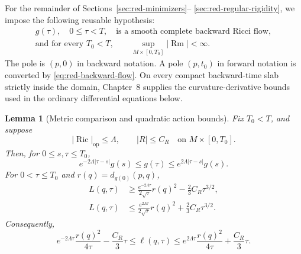 \documentclass[10pt]{coll-l}
\newtheorem{lemma}[theorem]{Lemma}
\theoremstyle{definition}
\theoremstyle{remark}
\numberwithin{section}{chapter}
\numberwithin{equation}{chapter}
\newcommand{\Ric}{\operatorname{Ric}}
\newcommand{\Rm}{\operatorname{Rm}}
\begin{document}
For the remainder of Sections~\ref{sec:red-minimizers}--
\ref{sec:red-regular-rigidity}, we impose the following reusable
hypothesis:
\begin{equation}
 \begin{gathered}
 g(\tau),\quad 0\leq\tau<T,\quad\text{is a smooth complete backward
 Ricci flow},\\
 \text{and for every }T_0<T,\qquad
 \sup_{M\times[0,T_0]}|\Rm|<\infty .
 \end{gathered}                                           \label{eq:red-standing-hypothesis}
\end{equation}
The pole is $(p,0)$ in backward notation.  A pole $(p,t_0)$ in forward
notation is converted by \eqref{eq:red-backward-flow}.  On every compact
backward-time slab strictly inside the domain, Chapter~8 supplies the
curvature-derivative bounds used in the ordinary differential equations
below.

\begin{lemma}[Metric comparison and quadratic action bounds]
\label{lem:red-quadratic-bounds}
Fix $T_0<T$, and suppose
\begin{equation}
       |\Ric|_{\mathrm{op}}\leq\Lambda,
       \qquad |R|\leq C_R
       \quad\text{on }M\times[0,T_0].                  \label{eq:red-curvature-bounds}
\end{equation}
Then, for $0\leq s,\tau\leq T_0$,
\begin{equation}
 e^{-2\Lambda|\tau-s|}g(s)\leq g(\tau)
       \leq e^{2\Lambda|\tau-s|}g(s).                 \label{eq:red-metric-comparison}
\end{equation}
For $0<\tau\leq T_0$ and $r(q)=d_{g(0)}(p,q)$,
\begin{align}
 L(q,\tau)&\geq
 \frac{e^{-2\Lambda\tau}}{2\sqrt\tau}r(q)^2
       -\frac23C_R\tau^{3/2},                          \label{eq:red-L-lower}\\
 L(q,\tau)&\leq
 \frac{e^{2\Lambda\tau}}{2\sqrt\tau}r(q)^2
       +\frac23C_R\tau^{3/2}.                          \label{eq:red-L-upper}
\end{align}
Consequently,
\begin{equation}
 e^{-2\Lambda\tau}\frac{r(q)^2}{4\tau}-\frac{C_R}{3}\tau
 \leq\ell(q,\tau)\leq
 e^{2\Lambda\tau}\frac{r(q)^2}{4\tau}+\frac{C_R}{3}\tau.
                                                               \label{eq:red-ell-quadratic}
\end{equation}
\end{lemma}
\end{document}
